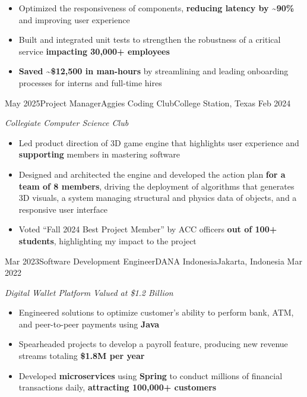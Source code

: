 \begin{experiences}
{\begin{itemize}
			\item Optimized the responsiveness of components, \textbf{reducing latency by \textasciitilde90\%} and improving user experience
			\item Built and integrated unit tests to strengthen the robustness of a critical service \textbf{impacting 30,000+ employees}
			\item \textbf{Saved \textasciitilde\$12,500 in man-hours} by streamlining and leading onboarding processes for interns and full-time hires
		\end{itemize}\vspace{-1em}}
		{}
	\emptySeparator
	\experience
		{May 2025}{Project Manager}{Aggies Coding Club}{College Station, Texas}
		{Feb 2024}
		{\footnotesize\emph{Collegiate Computer Science Club}
		\begin{itemize}
			\item Led product direction of 3D game engine that highlights user experience and \textbf{supporting} members in mastering software
			\item Designed and architected the engine and developed the action plan \textbf{for a team of 8 members}, driving the deployment of algorithms that generates 3D visuals, a system managing structural and physics data of objects, and a responsive user interface
			\item Voted ``Fall 2024 Best Project Member'' by ACC officers \textbf{out of 100+ students}, highlighting my impact to the project
		\end{itemize}\vspace{-1em}}
		{}
	\emptySeparator
	\experience
		{Mar 2023}{Software Development Engineer}{DANA Indonesia}{Jakarta, Indonesia}
		{Mar 2022}
		{\footnotesize\emph{Digital Wallet Platform Valued at \$1.2 Billion}
		\begin{itemize}
			\item Engineered solutions to optimize customer's ability to perform bank, ATM, and peer-to-peer payments using \textbf{Java}
			\item Spearheaded projects to develop a payroll feature, producing new revenue streams totaling \textbf{\$1.8M per year}
			\item Developed \textbf{microservices} using \textbf{Spring} to conduct millions of financial transactions daily, \textbf{attracting 100,000+ customers}
		\end{itemize}\vspace{-1em}}
		{}
\end{experiences}
